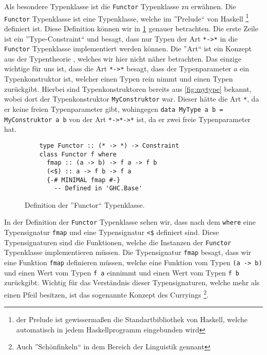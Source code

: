 \documentclass{hhuarticle}
\theoremstyle{definition}
\theoremstyle{theorem}
\begin{document}
  Als besondere Typenklasse ist die \verb|Functor| Typenklasse \cite{functorHaskellWiki} zu
  erwähnen. Die \verb|Functor| Typenklasse ist eine Typenklasse, welche
  im ''Prelude`` von Haskell
  \footnote{der Prelude ist gewissermaßen die Standartbibliothek von
  Haskell, welche automatisch in jedem Haskellprogramm eingebunden wird}
  definiert ist. Diese Definition können wir in
  \cref{fig:functorTypeClass} genauer betrachten.
  Die erste Zeile ist ein ''Type-Constraint`` und besagt, dass
  nur Typen der Art \verb|*->*| in die \verb|Functor| Typenklasse
  implementiert werden können. Die ''Art`` ist ein Konzept
  aus der Typentheorie \cite{kindHaskellWiki}, welches wir hier nicht näher betrachten.
  Das einzige wichtige für uns ist, dass die Art \verb|*->*|
  besagt, dass der Typenparameter $a$ ein Typenkonstruktor ist,
  welcher einen Typen rein nimmt und einen Typen zurückgibt.
  Hierbei sind Typenkonstruktoren bereits aus \cref{fig:mytype} bekannt,
  wobei dort der Typenkonstruktor \verb|MyConstruktor| war. Dieser
  hätte die Art \verb|*|, da er keine freien Typenparameter gibt,
  wohingegen \verb|data MyType a b = MyConstruktor a b| von der
  Art \verb|*->*->*| ist, da er zwei freie Typenparameter hat.

  \begin{figure}[h]
    \begin{verbatim}
    type Functor :: (* -> *) -> Constraint
    class Functor f where
      fmap :: (a -> b) -> f a -> f b
      (<$) :: a -> f b -> f a
      {-# MINIMAL fmap #-}
        -- Defined in 'GHC.Base'
    \end{verbatim}
    \caption{Definition der ''Functor`` Typenklasse.}%
    \label{fig:functorTypeClass}
  \end{figure}

  In der Definition der \verb|Functor| Typenklasse sehen wir, dass
  nach dem \verb|where| eine Typensignatur \verb|fmap| und eine
  Typensignatur \verb|<$| definiert sind. Diese Typensignaturen
  sind die Funktionen, welche die Instanzen der \verb|Functor| Typenklasse
  implementieren müssen.
  Die Typensignatur \verb|fmap| besagt, dass
  wir eine Funktion \verb|fmap| definieren müssen, welche eine Funktion
  vom Typen \verb|(a -> b)| und einen Wert vom Typen \verb|f a| einnimmt
  und einen Wert vom Typen \verb|f b| zurückgibt. Wichtig für das
  Verständnis dieser Typensignaturen, welche mehr als einen Pfeil besitzen,
  ist das sogenannte Konzept des Curryings
  \footnote{Auch ''Schönfinkeln`` in dem Bereich der Linguistik gennant}.
\end{document}

